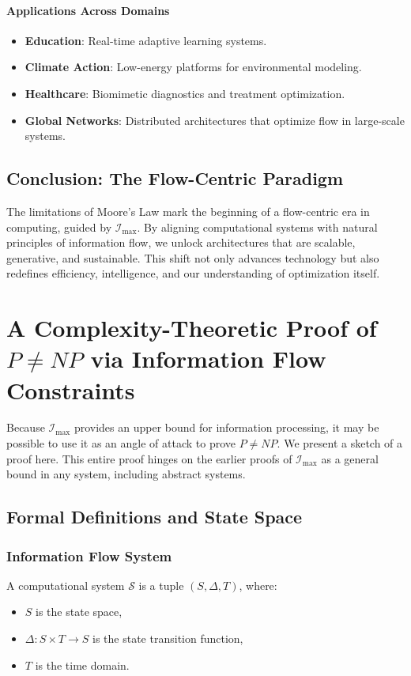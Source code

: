 \documentclass[12pt]{article}
\begin{document}
\paragraph{Applications Across Domains}
\begin{itemize}
    \item \textbf{Education}: Real-time adaptive learning systems.
    \item \textbf{Climate Action}: Low-energy platforms for environmental modeling.
    \item \textbf{Healthcare}: Biomimetic diagnostics and treatment optimization.
\item \textbf{Global Networks}: Distributed architectures that optimize flow in large-scale systems.
\end{itemize}


\subsection{Conclusion: The Flow-Centric Paradigm}

The limitations of Moore’s Law mark the beginning of a flow-centric era in computing, guided by \(\mathcal{I}_{\text{max}}\). By aligning computational systems with natural principles of information flow, we unlock architectures that are scalable, generative, and sustainable. This shift not only advances technology but also redefines efficiency, intelligence, and our understanding of optimization itself.


\section{A Complexity-Theoretic Proof of \(P \neq NP\) via Information Flow Constraints}
Because $\mathcal{I}_{\text{max}}$ provides an upper bound for information processing, it may be possible to use it as an angle of attack to prove \(P \neq NP\). We present a sketch of a proof here. This entire proof hinges on the earlier proofs of $\mathcal{I}_{\text{max}}$ as a general bound in any system, including abstract systems.

\subsection{Formal Definitions and State Space}

\subsubsection{Information Flow System}
A computational system \(\mathcal{S}\) is a tuple \((S, \Delta, T)\), where:
\begin{itemize}
    \item \(S\) is the state space,
    \item \(\Delta: S \times T \to S\) is the state transition function,
    \item \(T\) is the time domain.
\end{itemize}
\end{document}
